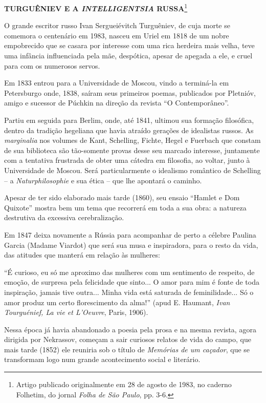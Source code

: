 \textbf{TURGUÊNIEV E A \emph{INTELLIGENTSIA} RUSSA}\footnote{Artigo
  publicado originalmente em 28 de agosto de 1983, no caderno Folhetim,
  do jornal \emph{Folha de São Paulo}, pp. 3-6.}

O grande escritor russo Ivan Sergueiévitch Turguêniev, de cuja morte se
comemora o centenário em 1983, nasceu em Uriel em 1818 de um nobre
empobrecido que se casara por interesse com uma rica herdeira mais
velha, teve uma infância influenciada pela mãe, despótica, apesar de
apegada a ele, e cruel para com os numerosos servos.

Em 1833 entrou para a Universidade de Moscou, vindo a terminá-la em
Petersburgo onde, 1838, saíram seus primeiros poemas, publicados por
Pletnióv, amigo e sucessor de Púchkin na direção da revista ``O
Contemporâneo''.

Partiu em seguida para Berlim, onde, até 1841, ultimou sua formação
filosófica, dentro da tradição hegeliana que havia atraído gerações de
idealistas russos. As \emph{marginalia} nos volumes de Kant, Schelling,
Fichte, Hegel e Fuerbach que constam de sua biblioteca são tão-somente
provas desse seu marcado interesse, juntamente com a tentativa frustrada
de obter uma cátedra em filosofia, ao voltar, junto à Universidade de
Moscou. Será particularmente o idealismo romântico de Schelling -- a
\emph{Naturphilosophie} e sua ética -- que lhe apontará o caminho.

Apesar de ter sido elaborado mais tarde (1860), seu ensaio ``Hamlet e
Dom Quixote'' mostra bem um tema que recorrerá em toda a sua obra: a
natureza destrutiva da excessiva cerebralização.

Em 1847 deixa novamente a Rússia para acompanhar de perto a célebre
Paulina Garcia (Madame Viardot) que será sua musa e inspiradora, para o
resto da vida, das atitudes que manterá em relação às mulheres:

``É curioso, eu só me aproximo das mulheres com um sentimento de
respeito, de emoção, de surpresa pela felicidade que sinto... O amor
para mim é fonte de toda inspiração, jamais tive outra... Minha vida
está saturada de feminilidade... Só o amor produz um certo florescimento
da alma!'' (apud E. Haumant, \emph{Ivan Tourguénief, La vie et
L'Oeuvre}, Paris, 1906).

Nessa época já havia abandonado a poesia pela prosa e na mesma revista,
agora dirigida por Nekrassov, começam a sair curiosos relatos de vida do
campo, que mais tarde (1852) ele reuniria sob o título de \emph{Memórias
de um caçador}, que se transformam logo num grande acontecimento social
e literário.

